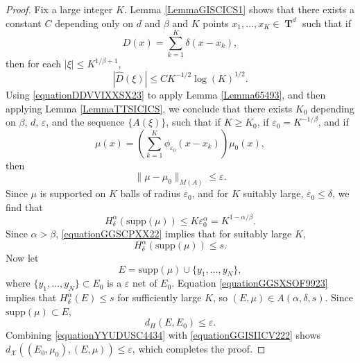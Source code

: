 \documentclass[12pt,reqno]{article}
\numberwithin{equation}{section}
\DeclareMathOperator{\TT}{\mathbf{T}}
\begin{document}
\begin{proof}
    Fix a large integer $K$. Lemma \ref{LemmaGISCICS1} shows that there exists a constant $C$ depending only on $d$ and $\beta$ and $K$ points $x_1, \dots, x_K \in \TT^d$ such that if
    \[ D(x) = \sum_{k = 1}^K \delta(x - x_k), \]
    then for each $|\xi| \leq K^{1/\beta + 1}$,
    \begin{equation} \label{equationDDVVIXXSX23}
        |\widehat{D}(\xi)| \leq C K^{-1/2} \log(K)^{1/2}.
    \end{equation}
    Using \eqref{equationDDVVIXXSX23} to apply Lemma \ref{Lemma65493}, and then applying Lemma \ref{LemmaTTSICICS}, we conclude that there exists $K_0$ depending on $\beta$, $d$, $\varepsilon$, and the sequence $\{ A(\xi) \}$, such that if $K \geq K_0$, if $\varepsilon_0 = K^{-1/\beta}$, and if
    \[ \mu(x) = \left( \sum_{k = 1}^K \phi_{\varepsilon_0}(x - x_k) \right) \mu_0(x), \]
    then
    \begin{equation} \label{equationYYUDUSC4434}
        \| \mu - \mu_0 \|_{M(A)} \leq \varepsilon.
    \end{equation}
    Since $\mu$ is supported on $K$ balls of radius $\varepsilon_0$, and for $K$ suitably large, $\varepsilon_0 \leq \delta$, we find that
    \begin{equation} \label{equationGGSCPXX22}
        H^\alpha_\delta(\text{supp}(\mu)) \leq K \varepsilon_0^\alpha = K^{1 - \alpha/\beta}.
    \end{equation}
    Since $\alpha > \beta$, \eqref{equationGGSCPXX22} implies that for suitably large $K$,
    \begin{equation} \label{equationGGSXSOF9923}
        H^\alpha_\delta(\text{supp}(\mu)) \leq s.
    \end{equation}
    Now let
    \[ E = \text{supp}(\mu) \cup \{ y_1, \dots, y_N \}, \]
    where $\{ y_1, \dots, y_N \} \subset E_0$ is a $\varepsilon$ net of $E_0$. Equation \eqref{equationGGSXSOF9923} implies that $H^\alpha_\delta(E) \leq s$ for sufficiently large $K$, so $(E,\mu) \in A(\alpha,\delta,s)$. Since $\text{supp}(\mu) \subset E$,
    \begin{equation} \label{equationGGISIICV222}
        d_H(E,E_0) \leq \varepsilon.
    \end{equation}
    Combining \eqref{equationYYUDUSC4434} with \eqref{equationGGISIICV222} shows $d_{\mathcal{X}}((E_0,\mu_0),(E,\mu)) \leq \varepsilon$, which completes the proof.
\end{proof}
\end{document}
